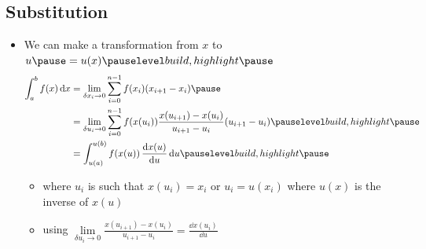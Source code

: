 \Outline %

\begin{slide}
\section[-2]{Substitution}
  
\begin{PauseHighLight}
  \begin{itemize}
  \item We can make a transformation from $x$ to $u\pause=u(x)\pauseb$
    \begin{align*}
      \int_a^b f(x) \, \dd x &= \lim_{\delta x_i \rightarrow 0}
      \sum_{i=0}^{n-1} f(x_i) (x_{i+1}-x_i) \pause\\
      &= \lim_{\delta u_i \rightarrow 0}
      \sum_{i=0}^{n-1} f(x(u_i)) \frac{x(u_{i+1})-x(u_i)}
      {u_{i+1}- u_i}   (u_{i+1}- u_i)\pauseb\\
      &= \int_{u(a)}^{u(b)} f(x(u)) \, \frac{\dd x(u)}{\dd u} \, \dd u\pauseb
    \end{align*}
    \begin{itemize}
    \item  where $u_i$ is such that $x(u_i) = x_i$ or $u_i=u(x_i)$
      where $u(x)$ is the inverse of $x(u)$\pause
    \item using $\lim\limits_{\delta u_i \rightarrow 0} \frac{x(u_{i+1})-x(u_i)}
      {u_{i+1}- u_i} = \frac{\dd x(u_i)}{\dd u}$\pauseb
    \end{itemize}
  \end{itemize}
\end{PauseHighLight}

\end{slide}


